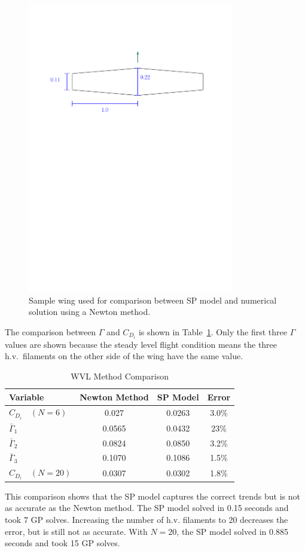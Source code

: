 \documentclass[10pt, a4paper]{article}
\begin{document}
\begin{figure}[h!]
	\begin{center}
	\includegraphics[width=0.8\textwidth]{samplewing.pdf}
    \caption{Sample wing used for comparison between SP model and numerical solution using a Newton method.}
\label{f:samplewing}
\end{center}
\end{figure}

The comparison between $\Gamma$ and $C_{D_i}$ is shown in Table~\ref{t:spcomp}.
Only the first three $\Gamma$ values are shown because the steady level flight condition means the three h.v.\ filaments on the other side of the wing have the same value.  

\begin{longtable}{lccc}
\caption{WVL Method Comparison}\\
\toprule
\toprule
\label{t:spcomp}
Variable            & Newton Method     & SP Model  & Error  \\ \midrule
$C_{D_i} \quad (N=6)$& 0.027             & 0.0263    & 3.0\%  \\
$\bar{\Gamma}_1$    & 0.0565            & 0.0432    & 23\%   \\
$\bar{\Gamma}_2$    & 0.0824            & 0.0850    & 3.2\%  \\
$\bar{\Gamma}_3$    & 0.1070            & 0.1086    & 1.5\%  \\
$C_{D_i} \quad (N=20)$& 0.0307            & 0.0302    & 1.8\%  \\
\bottomrule
\end{longtable}

This comparison shows that the SP model captures the correct trends but is not as accurate as the Newton method.  The SP model solved in 0.15 seconds and took 7 GP solves.  Increasing the number of h.v. filaments to 20 decreases the error, but is still not as accurate.  With $N=20$, the SP model solved in 0.885 seconds and took 15 GP solves. 
 
\end{document}
